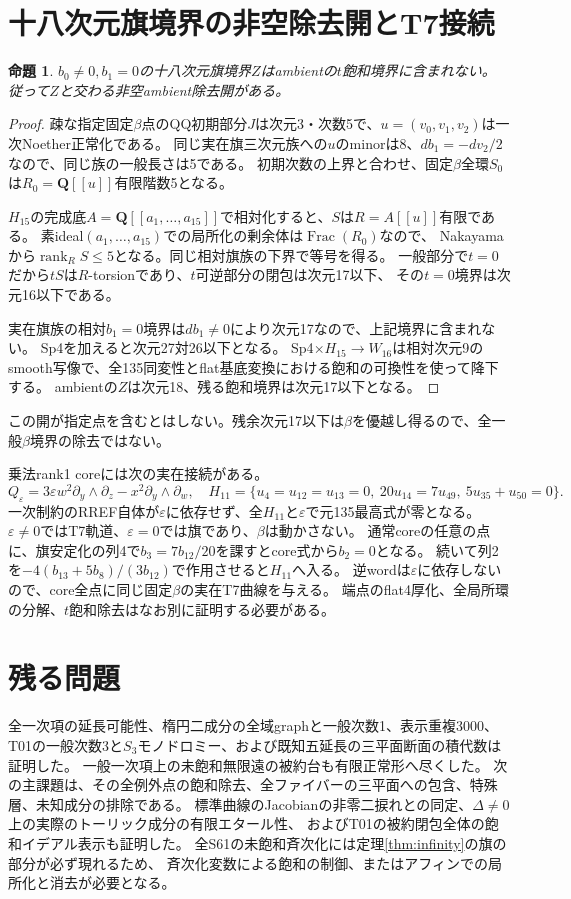 \documentclass[11pt,a4paper]{ltjsarticle}
\newcommand{\QQ}{\mathbf Q}
\newtheorem{proposition}[theorem]{命題}
\theoremstyle{remark}
\begin{document}
\section{十八次元旗境界の非空除去開とT7接続}
\begin{proposition}
$b_0\ne0,b_1=0$の十八次元旗境界$Z$はambientの$t$飽和境界に含まれない。
従って$Z$と交わる非空ambient除去開がある。
\end{proposition}
\begin{proof}
疎な指定固定$\beta$点のQQ初期部分$J$は次元3・次数5で、$u=(v_0,v_1,v_2)$は一次Noether正常化である。
同じ実在旗三次元族への$u$のminorは8、$db_1=-dv_2/2$なので、同じ族の一般長さは5である。
初期次数の上界と合わせ、固定$\beta$全環$S_0$は$R_0=\QQ[[u]]$有限階数5となる。

$H_{15}$の完成底$A=\QQ[[a_1,\ldots,a_{15}]]$で相対化すると、$S$は$R=A[[u]]$有限である。
素ideal$(a_1,\ldots,a_{15})$での局所化の剰余体は$\operatorname{Frac}(R_0)$なので、
Nakayamaから$\operatorname{rank}_R S\le5$となる。同じ相対旗族の下界で等号を得る。
一般部分で$t=0$だから$tS$は$R$-torsionであり、$t$可逆部分の閉包は次元17以下、
その$t=0$境界は次元16以下である。

実在旗族の相対$b_1=0$境界は$ db_1\ne0$により次元17なので、上記境界に含まれない。
Sp4を加えると次元27対26以下となる。
Sp4$\times H_{15}\to W_{16}$は相対次元9のsmooth写像で、全135同変性とflat基底変換における飽和の可換性を使って降下する。
ambientの$Z$は次元18、残る飽和境界は次元17以下となる\cite{flag-relative-open-v46}。
\end{proof}
この開が指定点を含むとはしない。残余次元17以下は$\beta$を優越し得るので、全一般$\beta$境界の除去ではない。

乗法rank1 coreには次の実在接続がある。
\[
 Q_\varepsilon=3\varepsilon w^2\partial_y\wedge\partial_z-x^2\partial_y\wedge\partial_w,
 \quad H_{11}=\{u_4=u_{12}=u_{13}=0,\ 20u_{14}=7u_{49},\ 5u_{35}+u_{50}=0\}.
\]
一次制約のRREF自体が$\varepsilon$に依存せず、全$H_{11}$と$\varepsilon$で元135最高式が零となる。
$\varepsilon\ne0$ではT7軌道、$\varepsilon=0$では旗であり、$\beta$は動かさない。
通常coreの任意の点に、旗安定化の列4で$b_3=7b_{12}/20$を課すとcore式から$b_2=0$となる。
続いて列2を$-4(b_{13}+5b_8)/(3b_{12})$で作用させると$H_{11}$へ入る。
逆wordは$\varepsilon$に依存しないので、core全点に同じ固定$\beta$の実在T7曲線を与える\cite{flag-t7-v46}。
端点のflat4厚化、全局所環の分解、$t$飽和除去はなお別に証明する必要がある。

\section{残る問題}
全一次項の延長可能性、楕円二成分の全域graphと一般次数1、表示重複3000、
T01の一般次数3と$S_3$モノドロミー、および既知五延長の三平面断面の積代数は証明した。
一般一次項上の未飽和無限遠の被約台も有限正常形へ尽くした。
次の主課題は、その全例外点の飽和除去、全ファイバーの三平面への包含、特殊層、未知成分の排除である。
標準曲線のJacobianの非零二捩れとの同定、$\Delta\ne0$上の実際のトーリック成分の有限エタール性、
およびT01の被約閉包全体の飽和イデアル表示も証明した。
全S61の未飽和斉次化には定理\ref{thm:infinity}の旗の部分が必ず現れるため、
斉次化変数による飽和の制御、またはアフィンでの局所化と消去が必要となる。
\end{document}
